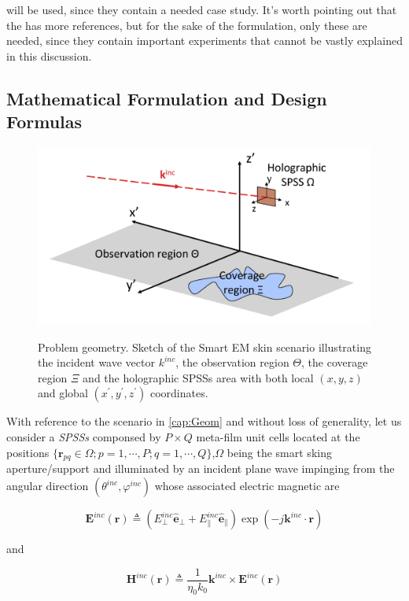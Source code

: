 will be used, since they contain a needed case study. It's worth pointing out that the \cite{Oliveri:2021} has more references, but for the sake of the formulation, only these are needed, since they contain important experiments that cannot be vastly explained in this discussion.
\subsection{Mathematical Formulation and Design Formulas}
\label{sub:Numerical-Validation}
\begin{figure}[H]
\centering
\includegraphics[scale=0.35]{./Figure/Figure01.png}
\label{Figure 1}
\caption{\footnotesize Problem geometry. Sketch of the Smart EM skin scenario illustrating the incident wave vector $k^{inc}$, the observation region $\Theta$, the coverage region $\Xi$ and the holographic SPSSs area with both local $(x, y, z)$ and global $(x^{'}, y^{'}, z^{'})$ coordinates.}
\end{figure}
With reference to the scenario in \ref{cap:Geom} and without loss
of generality, let us consider a \emph{SPSSs} componsed by $P\times Q$
meta-film unit cells located at the positions $\{\mathbf{\mathbf{r}}_{pq}\in\Omega;p=1,\cdots,P;q=1,\cdots,Q\}$,$\Omega$
being the smart sking aperture/support and illuminated by an incident
plane wave impinging from the angular direction $(\theta^{inc},\varphi^{inc})$
whose associated electric magnetic are

\begin{equation}
\mathbf{E}^{inc}(\mathbf{r})\triangleq(E_{\perp}^{inc}\mathbf{\hat{e}}_{\perp}+E_{\parallel}^{inc}\mathbf{\hat{e}}_{\parallel})\exp(-j\mathbf{k}^{inc}\cdot\mathbf{r})\label{eq:1}\end{equation}


and

\begin{equation}
\mathbf{H}^{inc}(\mathbf{r})\triangleq\frac{1}{\eta_{0}k_{0}}\mathbf{k}^{inc}\times\mathbf{E}^{inc}(\mathbf{r})\label{eq:2}\end{equation}


